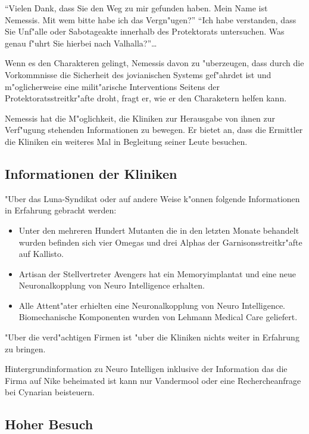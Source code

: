 "`Vielen Dank, dass Sie den Weg zu mir gefunden haben. Mein Name ist Nemessis. Mit wem bitte habe ich das Vergn"ugen?"'
"`Ich habe verstanden, dass Sie Unf"alle oder Sabotageakte innerhalb des Protektorats untersuchen. Was genau f"uhrt Sie hierbei nach Valhalla?"'\dots

Wenn es den Charakteren gelingt, Nemessis davon zu "uberzeugen, dass durch die Vorkommnisse die Sicherheit des jovianischen Systems gef"ahrdet ist und m"oglicherweise eine milit"arische Interventions Seitens der Protektoratsstreitkr"afte droht, fragt er, wie er den Charaketern helfen kann.

\begin{remarks}
Nemessis hat die M"oglichkeit, die Kliniken zur Herausgabe von ihnen zur Verf"ugung stehenden Informationen zu bewegen. Er bietet an, dass die Ermittler die Kliniken ein weiteres Mal in Begleitung seiner Leute besuchen.
\end{remarks}

\subsection{Informationen der Kliniken}

"Uber das Luna-Syndikat oder auf andere Weise k"onnen folgende Informationen in Erfahrung gebracht werden:

\begin{itemize}
\item Unter den mehreren Hundert Mutanten die in den letzten Monate behandelt wurden befinden sich vier Omegas und drei Alphas der Garnisonsstreitkr"afte auf Kallisto.
\item Artisan der Stellvertreter Avengers hat ein Memoryimplantat und eine neue Neuronalkopplung von Neuro Intelligence erhalten.
\item Alle Attent"ater erhielten eine Neuronalkopplung von Neuro Intelligence. Biomechanische Komponenten wurden von Lehmann Medical Care geliefert.
\end{itemize}

"Uber die verd"achtigen Firmen ist "uber die Kliniken nichts weiter in Erfahrung zu bringen.

\begin{remarks}
Hintergrundinformation zu Neuro Intelligen inklusive der Information das die Firma auf Nike beheimated ist kann nur Vandermool oder eine Rechercheanfrage bei Cynarian beisteuern.
\end{remarks}

\subsection{Hoher Besuch}

